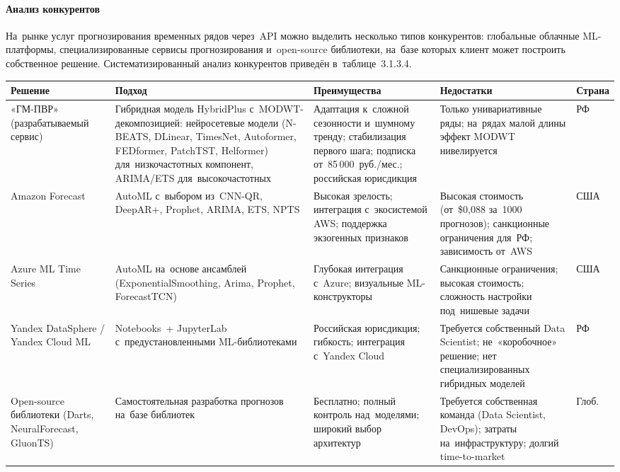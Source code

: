 \paragraph{Анализ конкурентов}

На~рынке услуг прогнозирования временных рядов через~API можно выделить
несколько типов конкурентов: глобальные облачные ML-платформы,
специализированные сервисы прогнозирования и~open-source библиотеки,
на~базе которых клиент может построить собственное решение. Систематизированный
анализ конкурентов приведён в~таблице~3.1.3.4.

{\footnotesize
\begin{longtable}{L{2.5cm} L{3.9cm} L{3.6cm} L{3.3cm} C{1.3cm}}
\toprule
Решение & Подход & Преимущества & Недостатки & Страна \\
\midrule
\endhead
«ГМ-ПВР» (разрабатываемый сервис) & Гибридная модель HybridPlus с~MODWT-декомпозицией: нейросетевые модели (N-BEATS, DLinear, TimesNet, Autoformer, FEDformer, PatchTST, Helformer) для~низкочастотных компонент, ARIMA/ETS для~высокочастотных & Адаптация к~сложной сезонности и~шумному тренду; стабилизация первого шага; подписка от~85\,000~руб./мес.; российская юрисдикция & Только унивариативные ряды; на~рядах малой длины эффект MODWT нивелируется & РФ \\
\midrule
Amazon Forecast & AutoML с~выбором из~CNN-QR, DeepAR+, Prophet, ARIMA, ETS, NPTS & Высокая зрелость; интеграция с~экосистемой AWS; поддержка экзогенных признаков & Высокая стоимость (от~\$0,088 за~1000 прогнозов); санкционные ограничения для~РФ; зависимость от~AWS & США \\
\midrule
Azure ML Time Series & AutoML на~основе ансамблей (ExponentialSmoothing, Arima, Prophet, ForecastTCN) & Глубокая интеграция с~Azure; визуальные ML-конструкторы & Санкционные ограничения; высокая стоимость; сложность настройки под~нишевые задачи & США \\
\midrule
Yandex DataSphere / Yandex Cloud ML & Notebooks~+ JupyterLab с~предустановленными ML-библиотеками & Российская юрисдикция; гибкость; интеграция с~Yandex Cloud & Требуется собственный Data Scientist; не~«коробочное» решение; нет специализированных гибридных моделей & РФ \\
\midrule
Open-source библиотеки (Darts, NeuralForecast, GluonTS) & Самостоятельная разработка прогнозов на~базе библиотек & Бесплатно; полный контроль над~моделями; широкий выбор архитектур & Требуется собственная команда (Data Scientist, DevOps); затраты на~инфраструктуру; долгий time-to-market & Глоб. \\
\bottomrule
\end{longtable}
}

